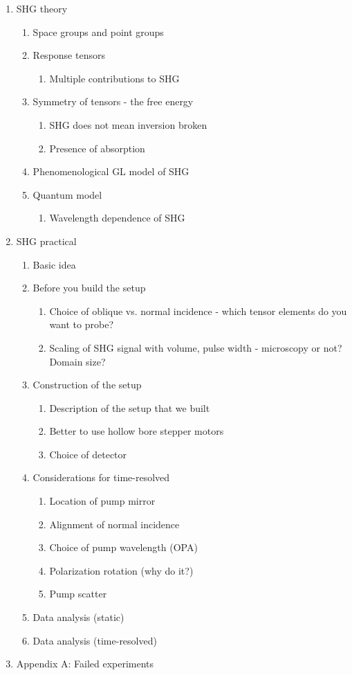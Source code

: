 \documentclass{article}
\begin{document}
\begin{enumerate}
\item SHG theory
    \begin{enumerate}
    \item Space groups and point groups
    \item Response tensors
        \begin{enumerate}
        \item Multiple contributions to SHG
        \end{enumerate}
    \item Symmetry of tensors - the free energy
        \begin{enumerate}
        \item SHG does not mean inversion broken
        \item Presence of absorption
        \end{enumerate}
    \item Phenomenological GL model of SHG
    \item Quantum model
        \begin{enumerate}
        \item Wavelength dependence of SHG
        \end{enumerate}
    \end{enumerate}
\item SHG practical
    \begin{enumerate}
    \item Basic idea
    \item Before you build the setup
        \begin{enumerate}
        \item Choice of oblique vs. normal incidence - which tensor elements do you want to probe?
        \item Scaling of SHG signal with volume, pulse width - microscopy or not? Domain size?
        \end{enumerate}
    \item Construction of the setup
        \begin{enumerate}
        \item Description of the setup that we built
        \item Better to use hollow bore stepper motors
        \item Choice of detector
        \end{enumerate}
    \item Considerations for time-resolved
        \begin{enumerate}
        \item Location of pump mirror
        \item Alignment of normal incidence
        \item Choice of pump wavelength (OPA)
        \item Polarization rotation (why do it?)
        \item Pump scatter
        \end{enumerate}
    \item Data analysis (static)
    \item Data analysis (time-resolved)
    \end{enumerate}
\item Appendix A: Failed experiments
\end{enumerate}
\end{document}
